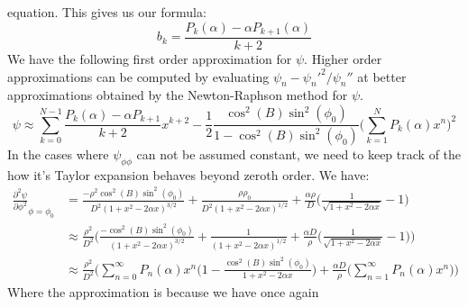             equation. This gives us our formula:
            \begin{equation*}
                b_{k}=\frac{P_{k}(\alpha)-\alpha{P}_{k+1}(\alpha)}{k+2}
            \end{equation*}
            We have the following first order approximation
            for $\psi$. Higher order approximations can be
            computed by evaluating
            $\psi_{n}-\psi_{n}'^{2}/\psi_{n}''$
            at better approximations obtained by the
            Newton-Raphson method for $\psi$.
            \begin{equation*}
                \psi\approx
                \sum_{k=0}^{N-1}
                \frac{P_{k}(\alpha)-\alpha{P}_{k+1}}{k+2}x^{k+2}
                -\frac{1}{2}
                \frac{\cos^{2}(B)\sin^{2}(\phi_{0})}
                     {1-\cos^{2}(B)\sin^{2}(\phi_{0})}
                \Big(\sum_{k=1}^{N}P_{k}(\alpha)x^{n}\Big)^{2}
            \end{equation*}
            In the cases where $\psi_{\phi\phi}$ can not be assumed
            constant, we need to keep track of the how it's Taylor
            expansion behaves beyond zeroth order. We have:
            \begin{align*}
                \frac{\partial^{2}\psi}
                     {\partial\phi^{2}}_{\phi=\phi_{0}}
                &=\frac{-\rho^{2}\cos^{2}(B)\sin^{2}(\phi_{0})}
                       {D^{2}(1+x^{2}-2\alpha{x})^{3/2}}
                  +\frac{\rho\rho_{0}}{D^{2}(1+x^{2}-2\alpha{x})^{1/2}}
                  +\frac{\alpha\rho}{D}
                  \Big(\frac{1}{\sqrt{1+x^{2}-2\alpha{x}}}-1\Big)\\
                &\approx\frac{\rho^{2}}{D^{2}}\bigg(
                    \frac{-\cos^{2}(B)\sin^{2}(\phi_{0})}
                         {(1+x^{2}-2\alpha{x})^{3/2}}+
                    \frac{1}{(1+x^{2}-2\alpha{x})^{1/2}}+
                    \frac{\alpha{D}}{\rho}
                    \Big(\frac{1}{\sqrt{1+x^{2}-2\alpha{x}}}-1\Big)
                \bigg)\\
                &\approx\frac{\rho^{2}}{D^{2}}\bigg(
                    \sum_{n=0}^{\infty}P_{n}(\alpha)x^{n}
                    \Big(1-\frac{\cos^{2}(B)\sin^{2}(\phi_{0})}
                                {1+x^{2}-2\alpha{x}}\Big)+
                    \frac{\alpha{D}}{\rho}
                    \Big(\sum_{n=1}^{\infty}P_{n}(\alpha)x^{n}\Big)
                \bigg)
            \end{align*}
            Where the approximation is because we have once again
